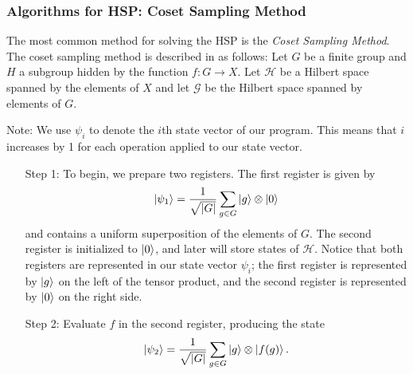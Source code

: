\documentclass{beamer}
\renewcommand{\ket}{\Ket}
\renewcommand{\ket}{\Ket}
\newcommand{\abs}[1]{\left\lvert #1 \right\rvert}
\renewcommand{\cal}[1]{\mathcal{#1}}
\begin{document}
\begin{frame}
\frametitle{Algorithms for HSP: Coset Sampling Method}\label{sec:HSP_algorithms}
        The most common method for solving the HSP is the \textit{Coset Sampling Method}.\\
        The coset sampling method is described in \cite{perepechaenko} as follows:
        Let $G$ be a finite group and $H$ a subgroup hidden by the function $f : G \to X$. Let $\cal{H}$ be a Hilbert space spanned by the elements of $X$ and let $\cal{G}$ be the Hilbert space spanned by elements of $G$.

        Note: We use $\psi_i$ to denote the $i$th state vector of our program. 
        This means that $i$ increases by 1 for each operation applied to our state vector.
        
        \begin{enumerate}
        \item[Step 1:]
            To begin, we prepare two registers. The first register is given by 
                $$\ket{\psi_1} = \frac{1}{\sqrt{\abs{G}}} \sum_{g \in G} \ket{g} \otimes \ket{0}$$
            and contains a uniform superposition of the elements of $G$. 
            The second register is initialized to $\ket{0}$, and later will store states of $\cal{H}$.
            Notice that both registers are represented in our state vector $\psi_i$; the first register is represented by $\ket{g}$ on the left of the tensor product, and the second register is represented by $\ket{0}$ on the right side.

        \item[Step 2:]
            Evaluate $f$ in the second register, producing the state
                $$\ket{\psi_2} = \frac{1}{\sqrt{\abs{G}}} \sum_{g \in G} \ket{g} \otimes \ket{f(g)}.$$


\end{enumerate}
\end{frame}
\end{document}
